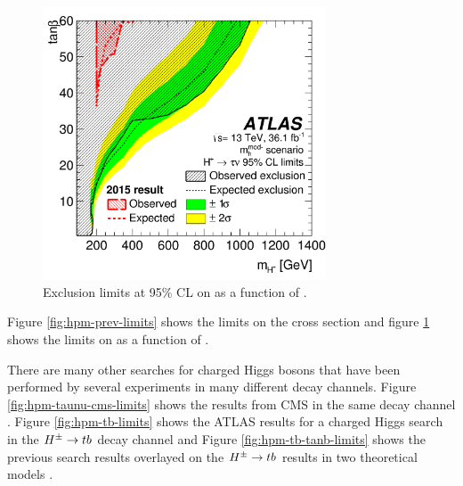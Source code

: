 		\begin{figure}[!ht]
			\centering
			\includegraphics[width=0.75\textwidth]{chapters/chapter2_theory/images/Previous_Limits_Combined_tanb.png}
			\caption{\label{fig:hpm-prev-limits-tanb} Exclusion limits at 95\% CL on \tanb as a function of \mHpm \cite{hpm-previous}. }
		\end{figure}
		Figure \ref{fig:hpm-prev-limits} shows the limits on the cross section and figure \ref{fig:hpm-prev-limits-tanb} shows the limits on \tanb as a function of \mHpm. 

		There are many other searches for charged Higgs bosons that have been performed by several experiments in many different decay channels. Figure \ref{fig:hpm-taunu-cms-limits} shows the results from CMS in the same \HpmLong decay channel \cite{CMS-taunu}. Figure \ref{fig:hpm-tb-limits} shows the ATLAS results for a charged Higgs search in the $H^{\pm} \to tb$ decay channel and Figure \ref{fig:hpm-tb-tanb-limits} shows the previous \HpmLong search results overlayed on the $H^{\pm} \to tb$ results in two theoretical models \cite{Hpm-to-tb}.

